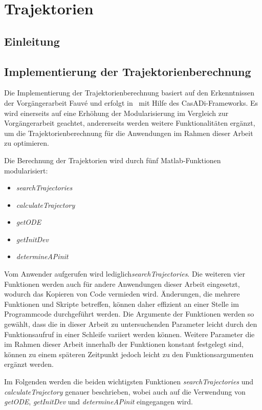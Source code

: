 \chapter{Trajektorien}\label{cha:trj}

\section{Einleitung}

\section{Implementierung der Trajektorienberechnung}

Die Implementierung der Trajektorienberechnung basiert auf den Erkenntnissen der Vorgängerarbeit Fauvé \cite{fauve} und erfolgt in \Matlab\ mit Hilfe des CasADi-Frameworks. Es wird einerseits auf eine Erhöhung der Modularisierung im Vergleich zur Vorgängerarbeit geachtet, andererseits werden weitere Funktionalitäten ergänzt, um die Trajektorienberechnung für die Anwendungen im Rahmen dieser Arbeit zu optimieren.

Die Berechnung der Trajektorien wird durch fünf Matlab-Funktionen modularisiert:
\begin{itemize}
	\item \textit{searchTrajectories}
	\item \textit{calculateTrajectory}
	\item \textit{getODE}
	\item \textit{getInitDev}
	\item \textit{determineAPinit}
\end{itemize}

Vom Anwender aufgerufen wird lediglich\textit{searchTrajectories}. Die weiteren vier Funktionen werden auch für andere Anwendungen dieser Arbeit eingesetzt, wodurch das Kopieren von Code vermieden wird. Änderungen, die mehrere Funktionen und Skripte betreffen, können daher effizient an einer Stelle im Programmcode durchgeführt werden. Die Argumente der Funktionen werden so gewählt, dass die in dieser Arbeit zu untersuchenden Parameter leicht durch den Funktionsaufruf in einer Schleife variiert werden können. Weitere Parameter die im Rahmen dieser Arbeit innerhalb der Funktionen konstant festgelegt sind, können zu einem späteren Zeitpunkt jedoch leicht zu den Funktionsargumenten ergänzt werden.

Im Folgenden werden die beiden wichtigsten Funktionen \textit{searchTrajectories} und \textit{calculateTrajectory} genauer beschrieben, wobei auch auf die Verwendung von \textit{getODE}, \textit{getInitDev} und \textit{determineAPinit} eingegangen wird.

